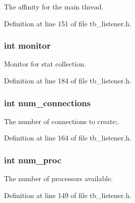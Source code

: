 The affinity for the main thread. 



Definition at line 151 of file tb\-\_\-listener.\-h.

\hypertarget{structtb__listener__t_a46fa1969de5714507943035793d36269}{
\subsubsection[{monitor}]{\setlength{\rightskip}{0pt plus 5cm}int monitor}}\label{structtb__listener__t_a46fa1969de5714507943035793d36269}


Monitor for stat collection. 



Definition at line 184 of file tb\-\_\-listener.\-h.

\hypertarget{structtb__listener__t_acbf48788378975ac1fb514027e3dc1ab}{
\subsubsection[{num\-\_\-connections}]{\setlength{\rightskip}{0pt plus 5cm}int num\-\_\-connections}}\label{structtb__listener__t_acbf48788378975ac1fb514027e3dc1ab}


The number of connections to create;. 



Definition at line 164 of file tb\-\_\-listener.\-h.

\hypertarget{structtb__listener__t_ae9a3e84ebf05ae6b7baf872b844c94ea}{
\subsubsection[{num\-\_\-proc}]{\setlength{\rightskip}{0pt plus 5cm}int num\-\_\-proc}}\label{structtb__listener__t_ae9a3e84ebf05ae6b7baf872b844c94ea}


The number of processors available. 



Definition at line 149 of file tb\-\_\-listener.\-h.

